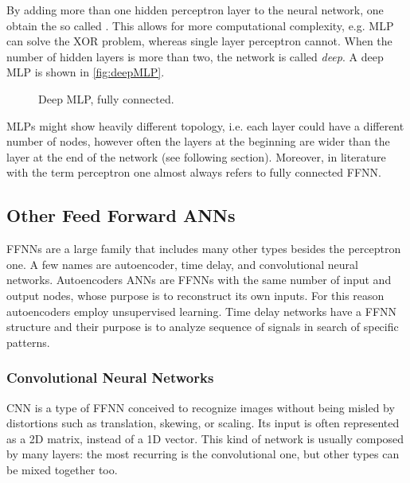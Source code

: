 By adding more than one hidden perceptron layer to the neural network, one obtain the so called .
This allows for more computational complexity, e.g. \acs{MLP} can solve the \acs{XOR} problem, whereas single layer perceptron cannot.
When the number of hidden layers is more than two, the network is called \textit{deep}.
A deep \acs{MLP} is shown in \autoref{fig:deepMLP}.

\begin{figure}[ht]
	\centering
	
	\caption{	Deep \acf{MLP}, fully connected.}
	\label{fig:deepMLP}
\end{figure}

\acsp{MLP} might show heavily different topology, i.e. each layer could have a different number of nodes, however often the layers at the beginning are wider than the layer at the end of the network (see following section).
Moreover, in literature with the term perceptron one almost always refers to fully connected \acs{FFNN}.

\subsection{Other Feed Forward \acsp{ANN}}
\label{ssec:Other_Feed_Forward_NNs}

\acsp{FFNN} are a large family that includes many other types besides the perceptron one.
A few names are autoencoder, time delay, and convolutional neural networks.
Autoencoders \acsp{ANN} are \acsp{FFNN} with the same number of input and output nodes, whose purpose is to reconstruct its own inputs.
For this reason autoencoders employ unsupervised learning.
Time delay networks have a \acs{FFNN} structure and their purpose is to analyze sequence of signals in search of specific patterns.

\subsubsection{Convolutional Neural Networks}
\label{par:Convolutional}
\ac{CNN} is a type of \acs{FFNN} conceived to recognize images without being misled by distortions such as translation, skewing, or scaling.
Its input is often represented as a 2D matrix, instead of a 1D vector.
This kind of network is usually composed by many layers: the most recurring is the convolutional one, but other types can be mixed together too.

